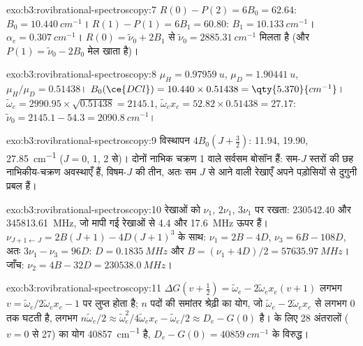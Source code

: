 \begin{solution}{exo:b3:rovibrational-spectroscopy:7}
$R(0) - P(2) = 6B_0 = 62.64$: $B_0 = \qty{10.440}{cm^{-1}}$। $R(1) - P(1) = 6B_1 = 60.80$:
$B_1 = \qty{10.133}{cm^{-1}}$। $\alpha_e = \qty{0.307}{cm^{-1}}$। $R(0) = \tilde\nu_0 + 2B_1$ से
$\tilde\nu_0 = \qty{2885.31}{cm^{-1}}$ मिलता है (और $P(1) = \tilde\nu_0 - 2B_0$ मेल खाता है)।
\end{solution}

\begin{solution}{exo:b3:rovibrational-spectroscopy:8}
$\mu_H = \qty{0.97959}{u}$, $\mu_D = \qty{1.90441}{u}$, $\mu_H/\mu_D = 0.51438$। $B_0(\ce{DCl})
= 10.440 \times 0.51438 = \qty{5.370}{cm^{-1}}$। $\tilde\omega_e = 2990.95 \times \sqrt{0.51438}
= 2145.1$, $\tilde\omega_ex_e = 52.82 \times 0.51438 = 27.17$: $\tilde\nu_0 = 2145.1 - 54.3 =
\qty{2090.8}{cm^{-1}}$।
\end{solution}

\begin{solution}{exo:b3:rovibrational-spectroscopy:9}
विस्थापन $4B_0(J + \frac32)$: 11.94, 19.90, \qty{27.85}{cm^{-1}} ($J = 0$, 1, 2 से)। दोनों
 नाभिक चक्रण 1 वाले सर्वसम बोसॉन हैं: सम-$J$ स्तरों की छह
नाभिकीय-चक्रण अवस्थाएँ हैं, विषम-$J$ की तीन, अतः सम $J$ से आने वाली रेखाएँ अपने
पड़ोसियों से दुगुनी प्रबल हैं।
\end{solution}

\begin{solution}{exo:b3:rovibrational-spectroscopy:10}
 रेखाओं को $\nu_1$, $2\nu_1$, $3\nu_1$ पर रखता: $230542.40$ और
\qty{345813.61}{MHz}, जो मापी गई रेखाओं से 4.4 और \qty{17.6}{MHz} ऊपर हैं।
$\nu_{J+1\leftarrow J} = 2B(J+1) - 4D(J+1)^3$ के साथ: $\nu_1 = 2B - 4D$, $\nu_3 = 6B - 108D$, अतः
$3\nu_1 - \nu_3 = 96D$: $D = \qty{0.1835}{MHz}$ और $B = (\nu_1 + 4D)/2 =
\qty{57635.97}{MHz}$। जाँच: $\nu_2 = 4B - 32D = \qty{230538.0}{MHz}$।
\end{solution}

\begin{solution}{exo:b3:rovibrational-spectroscopy:11}
$\Delta G(v + \frac12) = \tilde\omega_e - 2\tilde\omega_ex_e(v+1)$ लगभग $v =
\tilde\omega_e/2\tilde\omega_ex_e - 1$ पर लुप्त होता है; $n$ पदों की समांतर श्रेढ़ी का योग, जो $\tilde\omega_e - 2\tilde\omega_ex_e$ से लगभग 0 तक
घटती है, लगभग $n\tilde\omega_e/2 \approx
\tilde\omega_e^2/4\tilde\omega_ex_e - \tilde\omega_e/2 \approx D_e - G(0)$ है।  के लिए 28 अंतरालों
($v = 0$ से 27) का योग \qty{40857}{cm^{-1}} है, $D_e - G(0) = \qty{40859}{cm^{-1}}$ के विरुद्ध।
\end{solution}

